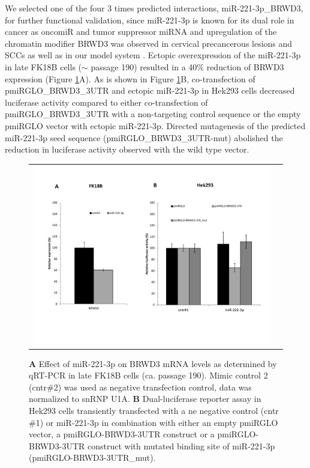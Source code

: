 We selected one of the four 3 times predicted interactions, miR-221-3p\_BRWD3, for further functional validation, since miR-221-3p is known for its dual role in cancer as oncomiR and tumor suppressor miRNA \cite{Garofalo2012} and upregulation of the chromatin modifier BRWD3 was observed in cervical precancerous lesions and SCCs as well as in our model system \cite{Boon2015}. Ectopic overexpression of the miR-221-3p in late FK18B cells ($\sim$ passage 190) resulted in a 40$\%$ reduction of BRWD3 expression (Figure \ref{fig:figure54}A). As is shown in Figure \ref{fig:figure54}B, co-transfection of pmiRGLO\_BRWD3\_3UTR and ectopic miR-221-3p in Hek293 cells decreased luciferase activity compared to either co-transfection of pmiRGLO\_BRWD3\_3UTR with a non-targeting control sequence or the empty pmiRGLO vector with ectopic miR-221-3p. Directed mutagenesis of the predicted miR-221-3p seed sequence (pmiRGLO\_BRWD3\_3UTR-mut) abolished the reduction in luciferase activity observed with the wild type vector.

\begin{figure}[h!]
\centering
\begin{tabular}{cc} 
\includegraphics[scale=0.6]{Figure4.pdf}
\end{tabular}
\caption{\textbf{A} Effect of miR-221-3p on BRWD3 mRNA levels as determined by qRT-PCR in late FK18B cells (ca. passage 190). Mimic control 2 (cntr$\#$2) was used as negative transfection control, data was normalized to snRNP U1A. \textbf{B} Dual-luciferase reporter assay in Hek293 cells transiently transfected with a ne negative control (cntr$\#$1) or miR-221-3p in combination with either an empty pmiRGLO vector, a pmiRGLO-BRWD3-3UTR construct or a pmiRGLO-BRWD3-3UTR construct with mutated binding site of miR-221-3p (pmiRGLO-BRWD3-3UTR\_mut).}
\label{fig:figure54}
\end{figure}


